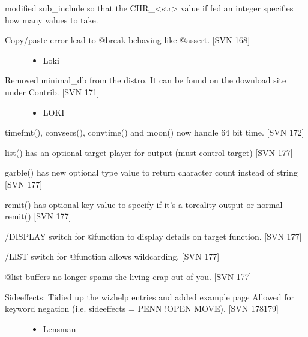 \documentclass[letterpaper,10pt,english]{sphinxmanual}
\begin{document}
\sphinxAtStartPar
modified sub\_include so that the CHR\_\textless{}str\textgreater{} value if fed an integer specifies how many values to take.
\begin{description}
\item[{Copy/paste error lead to @break behaving like @assert. {[}SVN 168{]}}] \leavevmode\begin{itemize}
\item {} 
\sphinxAtStartPar
Loki

\end{itemize}

\item[{Removed minimal\_db from the distro. It can be found on the download site under Contrib. {[}SVN 171{]}}] \leavevmode\begin{itemize}
\item {} 
\sphinxAtStartPar
LOKI

\end{itemize}

\end{description}

\sphinxAtStartPar
timefmt(), convsecs(), convtime() and moon() now handle 64 bit time. {[}SVN 172{]}

\sphinxAtStartPar
list() has an optional target player for output (must control target) {[}SVN 177{]}

\sphinxAtStartPar
garble() has new optional type value to return character count instead of string {[}SVN 177{]}

\sphinxAtStartPar
remit() has optional key value to specify if it’s a to\sphinxhyphen{}reality output or normal remit() {[}SVN 177{]}

\sphinxAtStartPar
/DISPLAY switch for @function to display details on target function. {[}SVN 177{]}

\sphinxAtStartPar
/LIST switch for @function allows wildcarding. {[}SVN 177{]}

\sphinxAtStartPar
@list buffers no longer spams the living crap out of you. {[}SVN 177{]}
\begin{description}
\item[{Sideeffects: Tidied up the wizhelp entries and added example page Allowed for keyword negation (i.e. sideeffects = PENN !OPEN MOVE). {[}SVN 178\sphinxhyphen{}179{]}}] \leavevmode\begin{itemize}
\item {} 
\sphinxAtStartPar
Lensman

\end{itemize}

\end{description}
\end{document}
